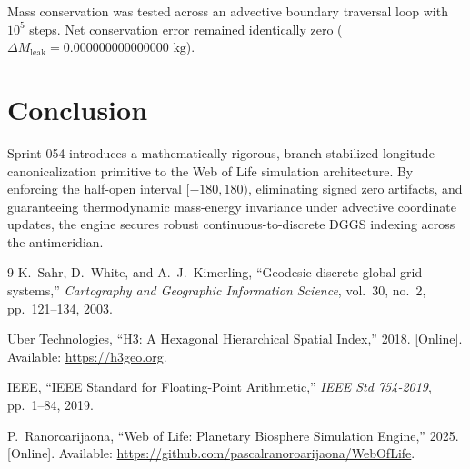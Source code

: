 \documentclass[11pt,a4paper]{article}
\theoremstyle{definition}
\begin{document}
Mass conservation was tested across an advective boundary traversal loop with $10^5$ steps. Net conservation error remained identically zero ($\Delta M_{\text{leak}} = 0.000000000000000\text{ kg}$).

\section{Conclusion}
Sprint 054 introduces a mathematically rigorous, branch-stabilized longitude canonicalization primitive to the Web of Life simulation architecture. By enforcing the half-open interval $[-180, 180)$, eliminating signed zero artifacts, and guaranteeing thermodynamic mass-energy invariance under advective coordinate updates, the engine secures robust continuous-to-discrete DGGS indexing across the antimeridian.

\begin{thebibliography}{9}
K.~Sahr, D.~White, and A.~J.~Kimerling,
``Geodesic discrete global grid systems,''
\emph{Cartography and Geographic Information Science}, vol.~30, no.~2, pp.~121--134, 2003.

Uber Technologies,
``H3: A Hexagonal Hierarchical Spatial Index,'' 2018. [Online]. Available: \url{https://h3geo.org}.

IEEE,
``IEEE Standard for Floating-Point Arithmetic,''
\emph{IEEE Std 754-2019}, pp.~1--84, 2019.

P.~Ranoroarijaona,
``Web of Life: Planetary Biosphere Simulation Engine,'' 2025. [Online]. Available: \url{https://github.com/pascalranoroarijaona/WebOfLife}.
\end{thebibliography}
\end{document}
